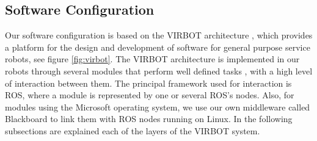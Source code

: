 \documentclass{llncs}
\begin{document}



\subsection{Software Configuration}
Our software configuration is based on the VIRBOT architecture \cite{virbot}, 
which provides a platform for the design and development of software for general purpose service robots, see figure \ref{fig:virbot}. 
The VIRBOT architecture is implemented in our robots through several modules that perform well defined tasks \cite{muller}, with a 
high level of interaction between them. The principal framework used for interaction is ROS, where a module is represented by one or 
several ROS's nodes. Also, for modules using the Microsoft operating system, we use our own middleware called Blackboard to
link them with ROS nodes running on Linux.
In the following subsections are explained each of the layers of the VIRBOT system.
\end{document}
